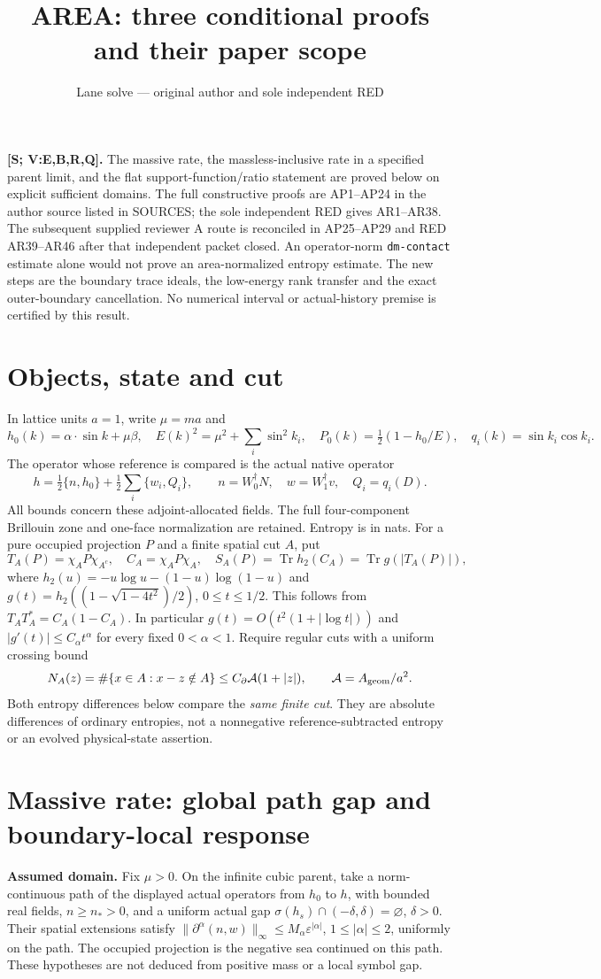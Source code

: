 \documentclass[10pt]{article}
\title{AREA: three conditional proofs and their paper scope}
\author{Lane solve --- original author and sole independent RED}
\date{}
\newcommand{\Tr}{\operatorname{Tr}}
\newcommand{\eps}{\varepsilon}
\begin{document}
\maketitle
\noindent\textbf{[S; V:E,B,R,Q].}
The massive rate, the massless-inclusive rate in a specified parent
limit, and the flat support-function/ratio statement are proved below
on explicit sufficient domains. The full constructive proofs are
AP1--AP24 in the author source listed in SOURCES; the sole independent
RED gives AR1--AR38. The subsequent supplied reviewer A route is reconciled
in AP25--AP29 and RED AR39--AR46 after that independent packet closed.
An operator-norm \texttt{dm-contact} estimate alone
would not prove an area-normalized entropy estimate. The new steps are
the boundary trace ideals, the low-energy rank transfer and the exact
outer-boundary cancellation. No numerical interval or actual-history
premise is certified by this result.

\section{Objects, state and cut}
In lattice units $a=1$, write $\mu=ma$ and
\[
 h_0(k)=\alpha\cdot\sin k+\mu\beta,\quad
 E(k)^2=\mu^2+\sum_i\sin^2k_i,\quad
 P_0(k)=\tfrac12(1-h_0/E),\quad q_i(k)=\sin k_i\cos k_i.
\]
The operator whose reference is compared is the actual native operator
\[
 h=\tfrac12\{n,h_0\}+\tfrac12\sum_i\{w_i,Q_i\},\qquad
 n=W_0^\dagger N,\quad w=W_1^\dagger v,\quad Q_i=q_i(D).
\]
All bounds concern these adjoint-allocated fields. The full four-component
Brillouin zone and one-face normalization are retained. Entropy is in nats.
For a pure occupied projection $P$ and a finite spatial cut $A$, put
\[
 T_A(P)=\chi_AP\chi_{A^c},\quad C_A=\chi_AP\chi_A,\quad
 S_A(P)=\Tr h_2(C_A)=\Tr g(|T_A(P)|),
\]
where $h_2(u)=-u\log u-(1-u)\log(1-u)$ and
$g(t)=h_2((1-\sqrt{1-4t^2})/2)$, $0\leq t\leq1/2$.
This follows from $T_AT_A^*=C_A(1-C_A)$.
In particular $g(t)=O(t^2(1+|\log t|))$ and
$|g'(t)|\leq C_\alpha t^\alpha$ for every fixed $0<\alpha<1$.
Require regular cuts with a uniform crossing bound
\[
 N_A(z)=\#\{x\in A:x-z\notin A\}
       \leq C_\partial\mathcal A(1+|z|),\qquad
 \mathcal A=A_{\rm geom}/a^2.
\]
Both entropy differences below compare the \emph{same finite cut}.
They are absolute differences of ordinary entropies, not a nonnegative
reference-subtracted entropy or an evolved physical-state assertion.

\section{Massive rate: global path gap and boundary-local response}
\textbf{Assumed domain.} Fix $\mu>0$. On the infinite cubic parent,
take a norm-continuous path of the displayed actual operators from $h_0$
to $h$, with bounded real fields, $n\geq n_*>0$, and a uniform actual
gap $\sigma(h_s)\cap(-\delta,\delta)=\varnothing$, $\delta>0$.
Their spatial extensions satisfy
$\|\partial^\alpha(n,w)\|_\infty\leq M_\alpha\eps^{|\alpha|}$,
$1\leq|\alpha|\leq2$, uniformly on the path. The occupied projection
is the negative sea continued on this path. These hypotheses are not
deduced from positive mass or a local symbol gap.
\end{document}
